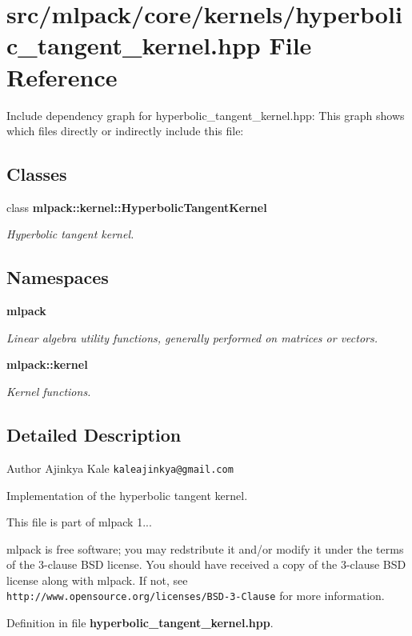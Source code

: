 \section{src/mlpack/core/kernels/hyperbolic\-\_\-tangent\-\_\-kernel.hpp File Reference}
\label{hyperbolic__tangent__kernel_8hpp}
Include dependency graph for hyperbolic\-\_\-tangent\-\_\-kernel.\-hpp\-:
This graph shows which files directly or indirectly include this file\-:
\subsection*{Classes}
\begin{DoxyCompactItemize}
\item 
class {\bf mlpack\-::kernel\-::\-Hyperbolic\-Tangent\-Kernel}
\begin{DoxyCompactList}\small\item\em Hyperbolic tangent kernel. \end{DoxyCompactList}\end{DoxyCompactItemize}
\subsection*{Namespaces}
\begin{DoxyCompactItemize}
\item 
{\bf mlpack}
\begin{DoxyCompactList}\small\item\em Linear algebra utility functions, generally performed on matrices or vectors. \end{DoxyCompactList}\item 
{\bf mlpack\-::kernel}
\begin{DoxyCompactList}\small\item\em Kernel functions. \end{DoxyCompactList}\end{DoxyCompactItemize}


\subsection{Detailed Description}
\begin{DoxyAuthor}{Author}
Ajinkya Kale {\tt kaleajinkya@gmail.\-com}
\end{DoxyAuthor}
Implementation of the hyperbolic tangent kernel.

This file is part of mlpack 1...

mlpack is free software; you may redstribute it and/or modify it under the terms of the 3-\/clause B\-S\-D license. You should have received a copy of the 3-\/clause B\-S\-D license along with mlpack. If not, see {\tt http\-://www.\-opensource.\-org/licenses/\-B\-S\-D-\/3-\/\-Clause} for more information. 

Definition in file {\bf hyperbolic\-\_\-tangent\-\_\-kernel.\-hpp}.

